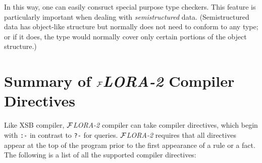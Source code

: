 \documentclass[11pt]{article}
\newcommand{\FLORA}{{\mbox{${\cal F}${\small\it LORA}\rm\emph{-2}}}\xspace}
\begin{document}
In this way, one can easily consruct special purpose type checkers.  This
feature is particularly important when dealing with \emph{semistructured}
data. (Semistructured data has object-like structure but normally does not
need to conform to any type; or if it does, the type would normally cover
only certain portions of the object structure.)


\section{Summary of \FLORA Compiler Directives} \label{sec-comp-directives}

%
%
Like XSB compiler, \FLORA compiler can take compiler directives, which
begin with {\tt :-} in contrast to {\tt ?-} for queries.  \FLORA requires
that all directives appear at the top of the program prior to the first
appearance of a rule or a fact.  The following is a list of all the supported
compiler directives:
\end{document}
